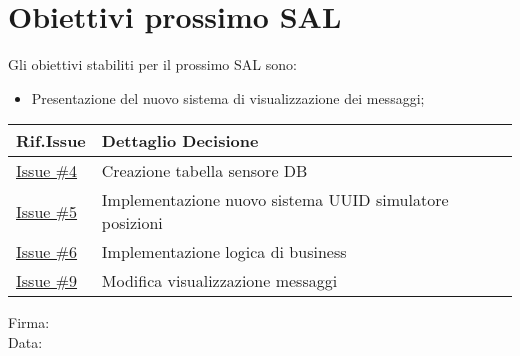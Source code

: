 \documentclass[10pt]{article}
\begin{document}
\section{Obiettivi prossimo SAL}
Gli obiettivi stabiliti per il prossimo SAL sono:
    \begin{itemize}
            \item Presentazione del nuovo sistema di visualizzazione dei messaggi;
    \end{itemize}
    \begin{center}
    \begin{tabular}{|>{\centering\arraybackslash}m{3cm}|>{\centering\arraybackslash}m{12cm}|}
	\hline
	\textbf{Rif.Issue} & \textbf{Dettaglio Decisione}\\
        \hline
            \href{https://github.com/SevenBitsSwe/MVP/issues/4}{Issue \#4} & Creazione tabella sensore DB \\
        \hline
            \href{https://github.com/SevenBitsSwe/MVP/issues/5}{Issue \#5} & Implementazione nuovo sistema UUID simulatore posizioni \\
        \hline
            \href{https://github.com/SevenBitsSwe/MVP/issues/6}{Issue \#6} & Implementazione logica di business\\
        \hline
            \href{https://github.com/SevenBitsSwe/MVP/issues/9}{Issue \#9} & Modifica visualizzazione messaggi\\
        \hline
    \end{tabular}
    \end{center}

\vfill
\begin{minipage}{10cm}
Firma: \hrulefill \\
\vspace{2mm}
Data: \dotfill
\end{minipage}
\end{document}
